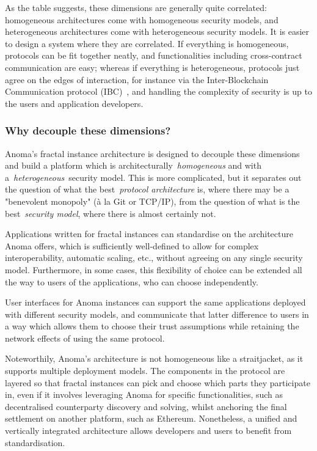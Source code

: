 \documentclass[
    9pt,            %
    commun,        %
    affiltop,       %
]{art}
\begin{document}
As the table suggests, these dimensions are generally quite correlated:
homogeneous architectures come with homogeneous security models, and
heterogeneous architectures come with heterogeneous security models. It
is easier to design a system where they are correlated. If everything is
homogeneous, protocols can be fit together neatly, and functionalities
including cross-contract communication are easy; whereas if everything
is heterogeneous, protocols just agree on the edges of interaction, for
instance via the Inter-Blockchain Communication protocol
(IBC)~\cite{goes2020interblockchain}, and handling the complexity of
security is up to the users and application developers.

\subsubsection{Why decouple these
dimensions?}\label{why-decouple-these-dimensions}

Anoma's fractal instance architecture is designed to
decouple these dimensions and build a platform which is
architecturally~\emph{homogeneous} and with
a~\emph{heterogeneous}~security model. This is more complicated, but it
separates out the question of what the best~\emph{protocol architecture}
is, where there may be a "benevolent monopoly" (à la Git or TCP/IP),
from the question of what is the best~\emph{security model}, where there
is almost certainly not.

Applications written for fractal instances can standardise on the
architecture Anoma offers, which is sufficiently well-defined to allow
for complex interoperability, automatic scaling, etc., without agreeing
on any single security model. Furthermore, in some cases, this
flexibility of choice can be extended all the way to users of the
applications, who can choose independently.

User interfaces for Anoma instances can support the same applications
deployed with different security models, and communicate that latter
difference to users in a way which allows them to choose their trust
assumptions while retaining the network effects of using the same
protocol.

Noteworthily, Anoma's architecture is not homogeneous
like a straitjacket, as it supports multiple deployment models. The
components in the protocol are layered so that fractal instances can
pick and choose which parts they participate in, even if it involves
leveraging Anoma for specific functionalities, such as decentralised
counterparty discovery and solving, whilst anchoring the final
settlement on another platform, such as Ethereum. Nonetheless, a unified
and vertically integrated architecture allows developers and users to
benefit from standardisation.
\end{document}
